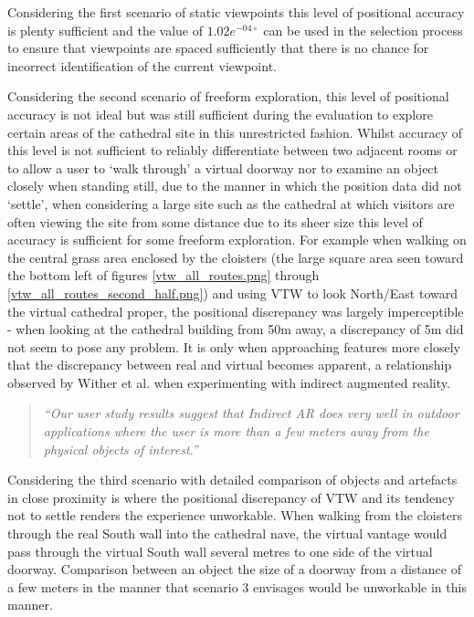 Considering the first scenario of static viewpoints this level of positional accuracy is plenty sufficient and the value of $1.02e^{-04\circ}$ can be used in the selection process to ensure that viewpoints are spaced sufficiently that there is no chance for incorrect identification of the current viewpoint.

Considering the second scenario of freeform exploration, this level of positional accuracy is not ideal but was still sufficient during the evaluation to explore certain areas of the cathedral site in this unrestricted fashion. Whilst accuracy of this level is not sufficient to reliably differentiate between two adjacent rooms or to allow a user to `walk through' a virtual doorway nor to examine an object closely when standing still, due to the manner in which the position data did not `settle', when considering a large site such as the cathedral at which visitors are often viewing the site from some distance due to its sheer size this level of accuracy is sufficient for some freeform exploration. For example when walking on the central grass area enclosed by the cloisters (the large square area seen toward the bottom left of figures \ref{vtw_all_routes.png} through \ref{vtw_all_routes_second_half.png}) and using VTW to look North/East toward the virtual cathedral proper, the positional discrepancy was largely imperceptible - when looking at the cathedral building from 50m away, a discrepancy of 5m did not seem to pose any problem. It is only when approaching features more closely that the discrepancy between real and virtual becomes apparent, a relationship observed by Wither et al. when experimenting with indirect augmented reality.

\begin{quote}
	\textit{``Our user study results suggest that Indirect AR does very well in outdoor applications where the user is more than a few meters away from the physical objects of interest.''}~\cite{Wither2011}
\end{quote}

Considering the third scenario with detailed comparison of objects and artefacts in close proximity is where the positional discrepancy of VTW and its tendency not to settle renders the experience unworkable. When walking from the cloisters through the real South wall into the cathedral nave, the virtual vantage would pass through the virtual South wall several metres to one side of the virtual doorway. Comparison between an object the size of a doorway from a distance of a few meters in the manner that scenario 3 envisages would be unworkable in this manner.

